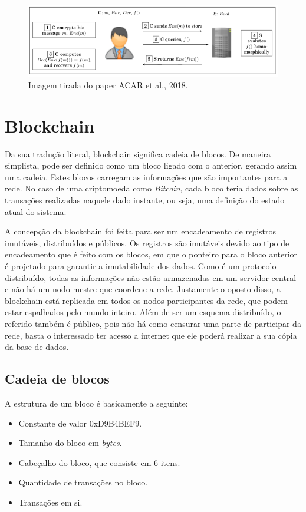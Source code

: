 \documentclass{ufsctex/ufsctex}
\begin{document}
\begin{figure}[h]
	\centering
	\includegraphics[scale=0.4]{crypto-homo}
	\caption{Imagem tirada do paper ACAR et al., 2018.}
	\label{fig:crypto-homo}
\end{figure}


\section{Blockchain}

Da sua tradução literal, blockchain significa cadeia de blocos. De  maneira
simplista, pode ser definido como um bloco ligado com o anterior, gerando assim
uma cadeia. Estes blocos carregam as informações que são importantes para a
rede. No caso de uma criptomoeda como \textit{Bitcoin}, cada bloco teria dados
sobre as transações realizadas naquele dado instante, ou seja, uma definição do
estado atual do sistema.

A concepção da blockchain foi feita para ser um encadeamento de registros
imutáveis, distribuídos e públicos. Os registros são imutáveis devido ao tipo de
encadeamento que é feito com os blocos, em que o ponteiro para o bloco anterior
é projetado para garantir a imutabilidade dos dados. Como é um protocolo
distribuído, todas as informações não estão armazenadas em um servidor central e
não há um nodo mestre que coordene a rede. Justamente o oposto disso, a
blockchain está replicada em todos os nodos participantes da rede, que podem
estar espalhados pelo mundo inteiro. Além de ser um esquema distribuído, o
referido também é público, pois não há como censurar uma parte de participar da
rede, basta o interessado ter acesso a internet que ele poderá realizar a sua
cópia da base de dados.\cite{blockchain}

\subsection{Cadeia de blocos}

A estrutura de um bloco é basicamente a seguinte:
\begin{itemize}
	\item Constante de valor 0xD9B4BEF9.
	\item Tamanho do bloco em \textit{bytes}.
	\item Cabeçalho do bloco, que consiste em 6 itens.
	\item Quantidade de transações no bloco.
	\item Transações em si.
\end{itemize}
\end{document}
